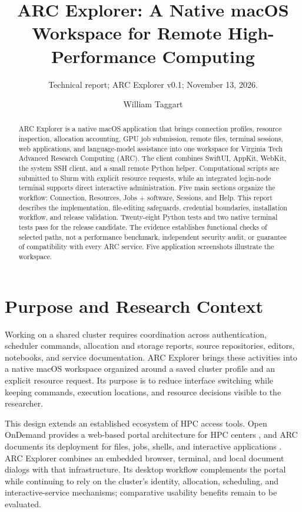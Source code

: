\documentclass[manuscript,screen,nonacm]{acmart}
\title{ARC Explorer: A Native macOS Workspace for Remote High-Performance Computing}
\subtitle{Technical report; ARC Explorer v0.1; November 13, 2026.}
\author{William Taggart}
\affiliation{\department{Modern and Classical Languages and Literatures}\institution{Virginia Tech}\city{Blacksburg}\state{Virginia}\country{USA}}
\begin{document}
\begin{abstract}
ARC Explorer is a native macOS application that brings connection profiles, resource inspection, allocation accounting, GPU job submission, remote files, terminal sessions, web applications, and language-model assistance into one workspace for Virginia Tech Advanced Research Computing (ARC). The client combines SwiftUI, AppKit, WebKit, the system SSH client, and a small remote Python helper. Computational scripts are submitted to Slurm with explicit resource requests, while an integrated login-node terminal supports direct interactive administration. Five main sections organize the workflow: Connection, Resources, Jobs + software, Sessions, and Help. This report describes the implementation, file-editing safeguards, credential boundaries, installation workflow, and release validation. Twenty-eight Python tests and two native terminal tests pass for the release candidate. The evidence establishes functional checks of selected paths, not a performance benchmark, independent security audit, or guarantee of compatibility with every ARC service. Five application screenshots illustrate the workspace.
\end{abstract}
\maketitle

\section{Purpose and Research Context}

Working on a shared cluster requires coordination across authentication, scheduler commands, allocation and storage reports, source repositories, editors, notebooks, and service documentation. ARC Explorer brings these activities into a native macOS workspace organized around a saved cluster profile and an explicit resource request. Its purpose is to reduce interface switching while keeping commands, execution locations, and resource decisions visible to the researcher.

This design extends an established ecosystem of HPC access tools. Open OnDemand provides a web-based portal architecture for HPC centers \cite{hudak2018}, and ARC documents its deployment for files, jobs, shells, and interactive applications \cite{arcood}. ARC Explorer combines an embedded browser, terminal, and local document dialogs with that infrastructure. Its desktop workflow complements the portal while continuing to rely on the cluster's identity, allocation, scheduling, and interactive-service mechanisms; comparative usability benefits remain to be evaluated.
\end{document}
